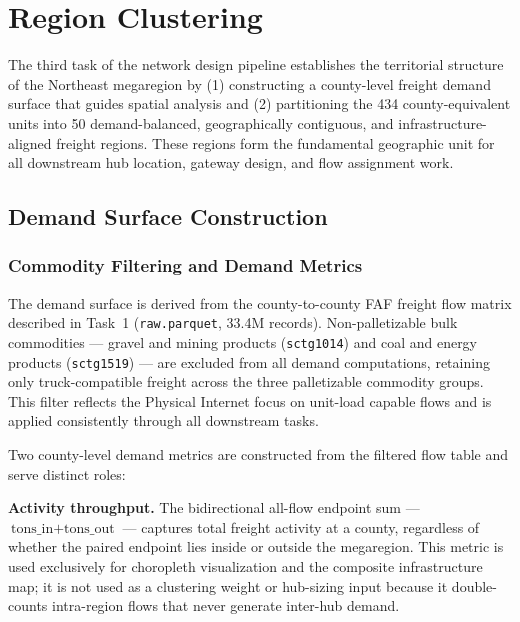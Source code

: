
\section{Region Clustering}

The third task of the network design pipeline establishes the territorial structure of the
Northeast megaregion by (1) constructing a county-level freight demand surface that guides
spatial analysis and (2) partitioning the 434 county-equivalent units into 50 demand-balanced,
geographically contiguous, and infrastructure-aligned freight regions. These regions form the
fundamental geographic unit for all downstream hub location, gateway design, and flow
assignment work.

\subsection{Demand Surface Construction}

\subsubsection{Commodity Filtering and Demand Metrics}

The demand surface is derived from the county-to-county FAF freight flow matrix described in
Task~1 (\texttt{raw.parquet}, 33.4M records). Non-palletizable bulk commodities --- gravel and
mining products (\texttt{sctg1014}) and coal and energy products (\texttt{sctg1519}) --- are
excluded from all demand computations, retaining only truck-compatible freight across the
three palletizable commodity groups. This filter reflects the Physical Internet focus on
unit-load capable flows and is applied consistently through all downstream tasks.

Two county-level demand metrics are constructed from the filtered flow table and serve
distinct roles:

\textbf{Activity throughput.} The bidirectional all-flow endpoint sum --- $\text{tons\_in} +
\text{tons\_out}$ --- captures total freight activity at a county, regardless of whether the
paired endpoint lies inside or outside the megaregion. This metric is used exclusively for
choropleth visualization and the composite infrastructure map; it is not used as a clustering
weight or hub-sizing input because it double-counts intra-region flows that never generate
inter-hub demand.

